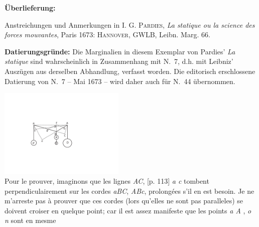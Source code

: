 \begin{ledgroupsized}[r]{120mm}
\footnotesize 
\pstart 
\noindent\textbf{\"{U}berlieferung:}
\pend
\end{ledgroupsized}

\begin{ledgroupsized}[r]{114mm}
\footnotesize 
\pstart \parindent -6mm
%
Anstreichungen und Anmerkungen in \textsc{I. G. Pardies}, \textit{La statique ou la science des forces mouvantes},\cite{00296} Paris 1673: \textsc{Hannover}, GWLB, Leibn. Marg. 66.
\pend
\end{ledgroupsized}
\vspace*{5mm}
\begin{ledgroup}
\footnotesize 
\pstart
\noindent\footnotesize{\textbf{Datierungsgr\"{u}nde:} Die Marginalien in diesem Exemplar von Pardies' \textit{La statique}\cite{00296} sind wahr\-schein\-lich in Zusammenhang mit N.~7, %
d.h. mit Leibniz' Auszügen aus derselben Abhandlung, verfasst worden.
Die editorisch erschlossene Datierung von N.~7 -- Mai 1673 -- wird daher auch für N.~44 übernommen.}
\pend
\end{ledgroup}

\vspace{8mm}
\pstart 
\normalsize
\noindent [p. 112] 
\pend
\pstart
\centering                    
\noindent \includegraphics[width=0.45\textwidth]{images/pardies1673-d1.pdf}\\
              \noindent {} 
\pend
\vspace{1em}
\count{}
\pstart Pour le prouver, imaginons que les lignes \textit{AC}, [p. 113] \textit{a c} tombent perpendiculairement sur les cordes \textit{aBC}, \textit{ABc}, prolong\'{e}es s'il en est besoin.
\pend 
\pstart 
[p. 122] Je ne m'arreste pas \`{a} prouver que ces cordes (lors qu'elles ne sont pas paralleles) se doivent croiser en quelque point; car il est assez manifeste que les points \textit{a A} , \textit{o n} sont en mesme 
\pend
\count{}
 

